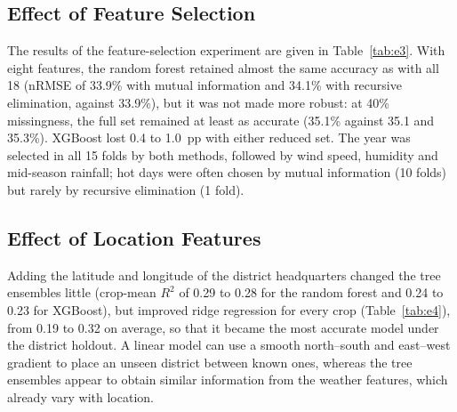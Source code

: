 \subsection{Effect of Feature Selection}

The results of the feature-selection experiment are given in Table~\ref{tab:e3}. With eight
features, the random forest retained almost the same accuracy as with all 18 (nRMSE of 33.9\% with
mutual information and 34.1\% with recursive elimination, against 33.9\%), but it was not made more
robust: at 40\% missingness, the full set remained at least as accurate (35.1\% against 35.1 and
35.3\%). XGBoost lost 0.4 to 1.0~pp with either reduced set. The year was selected in all 15 folds
by both methods, followed by wind speed, humidity and mid-season rainfall; hot days were often
chosen by mutual information (10 folds) but rarely by recursive elimination (1 fold).

\begin{table}[!t]
\caption{Feature Selection Under the District Holdout and MCAR Missingness (nRMSE in \% and $R^2$,
Mean Over Crops)}\label{tab:e3}
\centering\footnotesize\setlength{\tabcolsep}{2.6pt}

\end{table}

\subsection{Effect of Location Features}

Adding the latitude and longitude of the district headquarters changed the tree ensembles little
(crop-mean $R^2$ of 0.29 to 0.28 for the random forest and 0.24 to 0.23 for XGBoost), but improved
ridge regression for every crop (Table~\ref{tab:e4}), from 0.19 to 0.32 on average, so that it
became the most accurate model under the district holdout. A linear model can use a smooth
north--south and east--west gradient to place an unseen district between known ones, whereas the
tree ensembles appear to obtain similar information from the weather features, which already vary
with location.

\begin{table}[!t]
\caption{$R^2$ Without $\rightarrow$ With Location Features, District Holdout}\label{tab:e4}
\centering\footnotesize

\end{table}
